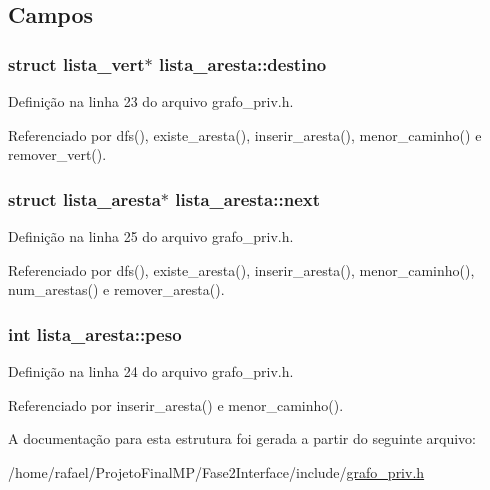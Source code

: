 \subsection{Campos}
\hypertarget{structlista__aresta_a324d065ab2fc1df5d59128027c4c8a5a}{}
\subsubsection[{destino}]{\setlength{\rightskip}{0pt plus 5cm}struct {\bf lista\+\_\+vert}$\ast$ lista\+\_\+aresta\+::destino}\label{structlista__aresta_a324d065ab2fc1df5d59128027c4c8a5a}


Definição na linha 23 do arquivo grafo\+\_\+priv.\+h.



Referenciado por dfs(), existe\+\_\+aresta(), inserir\+\_\+aresta(), menor\+\_\+caminho() e remover\+\_\+vert().

\hypertarget{structlista__aresta_a55d9a8d5fcc901c1d8802239735b4af7}{}
\subsubsection[{next}]{\setlength{\rightskip}{0pt plus 5cm}struct {\bf lista\+\_\+aresta}$\ast$ lista\+\_\+aresta\+::next}\label{structlista__aresta_a55d9a8d5fcc901c1d8802239735b4af7}


Definição na linha 25 do arquivo grafo\+\_\+priv.\+h.



Referenciado por dfs(), existe\+\_\+aresta(), inserir\+\_\+aresta(), menor\+\_\+caminho(), num\+\_\+arestas() e remover\+\_\+aresta().

\hypertarget{structlista__aresta_aecaf90a9521bc8a80a0b67f80603b6ce}{}
\subsubsection[{peso}]{\setlength{\rightskip}{0pt plus 5cm}int lista\+\_\+aresta\+::peso}\label{structlista__aresta_aecaf90a9521bc8a80a0b67f80603b6ce}


Definição na linha 24 do arquivo grafo\+\_\+priv.\+h.



Referenciado por inserir\+\_\+aresta() e menor\+\_\+caminho().



A documentação para esta estrutura foi gerada a partir do seguinte arquivo\+:\begin{DoxyCompactItemize}
\item 
/home/rafael/\+Projeto\+Final\+M\+P/\+Fase2\+Interface/include/\hyperlink{grafo__priv_8h}{grafo\+\_\+priv.\+h}\end{DoxyCompactItemize}
